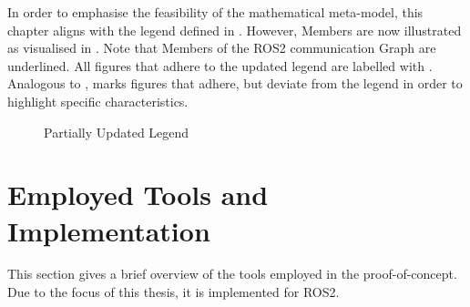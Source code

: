 In order to emphasise the feasibility of the mathematical meta-model, this chapter aligns with the legend defined in . However, Members are now illustrated as visualised in . Note that Members of the ROS2 communication Graph are underlined. All figures that adhere to the updated legend are labelled with \circledLegend. Analogous to \legendadapted, \circledLegendadapted marks figures that adhere, but deviate from the legend in order to highlight specific characteristics.
\begin{figure}[h]
    \centering
    \hypertarget{target:circledLegend}{}
    
    \caption[Partially Updated Legend]{Partially Updated Legend \circledLegend} \label{fig:neo4j:legend}
\end{figure}

\section{Employed Tools and Implementation} \label{sec:evaluation:tools}
    This section gives a brief overview of the tools employed in the proof-of-concept. Due to the focus of this thesis, it is implemented for ROS2.

